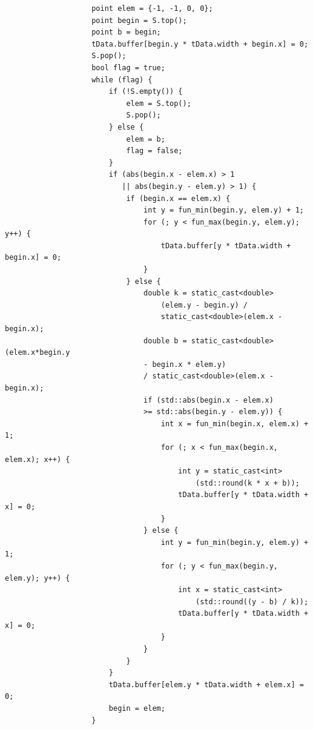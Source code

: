 \documentclass{report}
\begin{document}
\begin{lstlisting}
                    point elem = {-1, -1, 0, 0};
                    point begin = S.top();
                    point b = begin;
                    tData.buffer[begin.y * tData.width + begin.x] = 0;
                    S.pop();
                    bool flag = true;
                    while (flag) {
                        if (!S.empty()) {
                            elem = S.top();
                            S.pop();
                        } else {
                            elem = b;
                            flag = false;
                        }
                        if (abs(begin.x - elem.x) > 1
                           || abs(begin.y - elem.y) > 1) {
                            if (begin.x == elem.x) {
                                int y = fun_min(begin.y, elem.y) + 1;
                                for (; y < fun_max(begin.y, elem.y); y++) {
                                    tData.buffer[y * tData.width + begin.x] = 0;
                                }
                            } else {
                                double k = static_cast<double>
                                    (elem.y - begin.y) /
                                    static_cast<double>(elem.x - begin.x);
                                double b = static_cast<double>(elem.x*begin.y
                                - begin.x * elem.y)
                                / static_cast<double>(elem.x - begin.x);
                                if (std::abs(begin.x - elem.x)
                                >= std::abs(begin.y - elem.y)) {
                                    int x = fun_min(begin.x, elem.x) + 1;
                                    for (; x < fun_max(begin.x, elem.x); x++) {
                                        int y = static_cast<int>
                                            (std::round(k * x + b));
                                        tData.buffer[y * tData.width + x] = 0;
                                    }
                                } else {
                                    int y = fun_min(begin.y, elem.y) + 1;
                                    for (; y < fun_max(begin.y, elem.y); y++) {
                                        int x = static_cast<int>
                                            (std::round((y - b) / k));
                                        tData.buffer[y * tData.width + x] = 0;
                                    }
                                }
                            }
                        }
                        tData.buffer[elem.y * tData.width + elem.x] = 0;
                        begin = elem;
                    }


\end{lstlisting}
\end{document}
